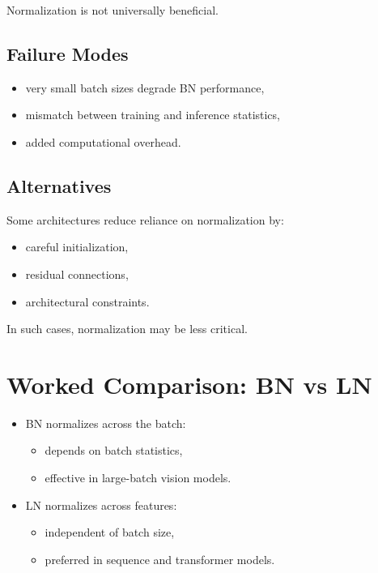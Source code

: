 Normalization is not universally beneficial.

\subsection{Failure Modes}

\begin{itemize}
    \item very small batch sizes degrade BN performance,
    \item mismatch between training and inference statistics,
    \item added computational overhead.
\end{itemize}

\subsection{Alternatives}

Some architectures reduce reliance on normalization by:
\begin{itemize}
    \item careful initialization,
    \item residual connections,
    \item architectural constraints.
\end{itemize}

In such cases, normalization may be less critical.

\section{Worked Comparison: BN vs LN}

\begin{itemize}
    \item BN normalizes across the batch:
    \begin{itemize}
        \item depends on batch statistics,
        \item effective in large-batch vision models.
    \end{itemize}
    \item LN normalizes across features:
    \begin{itemize}
        \item independent of batch size,
        \item preferred in sequence and transformer models.
    \end{itemize}
\end{itemize}

